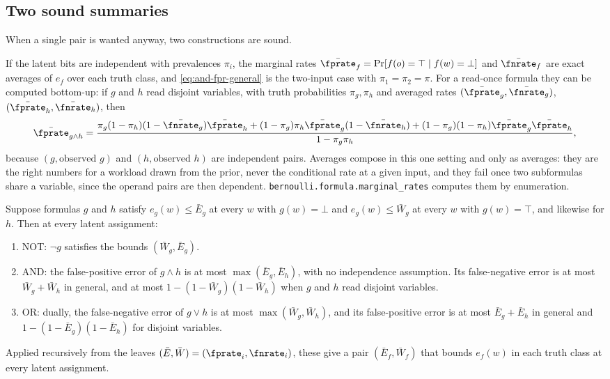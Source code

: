 \subsection*{Two sound summaries}

When a single pair is wanted anyway, two constructions are sound.

\begin{remark}
\label{rem:prior-averaged-composition}
If the latent bits are independent with prevalences $\pi_i$, the marginal rates
$\bar{\fprate}_f = \Pr[f(o) = \top \mid f(w) = \bot]$ and $\bar{\fnrate}_f$ are
exact averages of $e_f$ over each truth class, and
\eqref{eq:and-fpr-general} is the two-input case with $\pi_1 = \pi_2 = \pi$.
For a read-once formula they can be computed bottom-up: if $g$ and $h$ read
disjoint variables, with truth probabilities $\pi_g, \pi_h$ and averaged rates
$(\bar{\fprate}_g, \bar{\fnrate}_g)$, $(\bar{\fprate}_h, \bar{\fnrate}_h)$, then
\[
  \bar{\fprate}_{g \wedge h}
  = \frac{\pi_g(1 - \pi_h)(1 - \bar{\fnrate}_g)\bar{\fprate}_h
        + (1 - \pi_g)\pi_h \bar{\fprate}_g (1 - \bar{\fnrate}_h)
        + (1 - \pi_g)(1 - \pi_h)\bar{\fprate}_g \bar{\fprate}_h}
       {1 - \pi_g \pi_h},
\]
because $(g, \text{observed } g)$ and $(h, \text{observed } h)$ are independent
pairs. Averages compose in this one setting and only as averages: they are the
right numbers for a workload drawn from the prior, never the conditional rate at
a given input, and they fail once two subformulas share a variable, since the
operand pairs are then dependent. \texttt{bernoulli.formula.marginal\_rates}
computes them by enumeration.
\end{remark}

\begin{proposition}
\label{prop:worst-case-rate-bounds}
Suppose formulas $g$ and $h$ satisfy $e_g(w) \le \bar{E}_g$ at every $w$ with
$g(w) = \bot$ and $e_g(w) \le \bar{W}_g$ at every $w$ with $g(w) = \top$, and
likewise for $h$. Then at every latent assignment:
\begin{enumerate}
  \item NOT: $\neg g$ satisfies the bounds $(\bar{W}_g, \bar{E}_g)$.
  \item AND: the false-positive error of $g \wedge h$ is at most $\max(\bar{E}_g,
    \bar{E}_h)$, with no independence assumption. Its false-negative error is at
    most $\bar{W}_g + \bar{W}_h$ in general, and at most $1 - (1 - \bar{W}_g)(1 -
    \bar{W}_h)$ when $g$ and $h$ read disjoint variables.
  \item OR: dually, the false-negative error of $g \vee h$ is at most
    $\max(\bar{W}_g, \bar{W}_h)$, and its false-positive error is at most
    $\bar{E}_g + \bar{E}_h$ in general and $1 - (1 - \bar{E}_g)(1 - \bar{E}_h)$
    for disjoint variables.
\end{enumerate}
Applied recursively from the leaves $(\bar{E}, \bar{W}) = (\fprate_i,
\fnrate_i)$, these give a pair $(\bar{E}_f, \bar{W}_f)$ that bounds $e_f(w)$ in
each truth class at every latent assignment.
\end{proposition}

